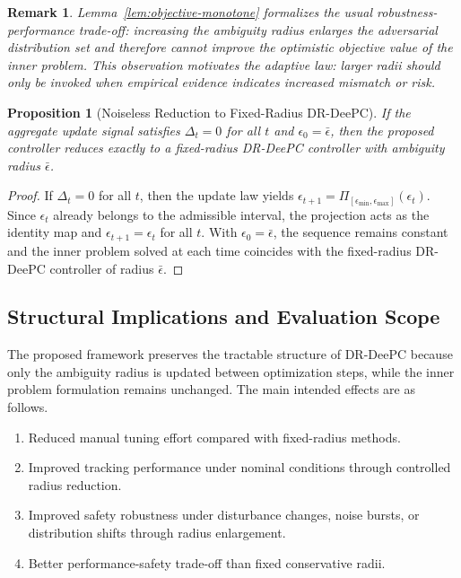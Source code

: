 \documentclass[conference]{IEEEtran}
\newtheorem{proposition}{Proposition}
\newtheorem{remark}{Remark}
\begin{document}
\begin{remark}
Lemma~\ref{lem:objective-monotone} formalizes the usual robustness-performance trade-off: increasing the ambiguity radius enlarges the adversarial distribution set and therefore cannot improve the optimistic objective value of the inner problem. This observation motivates the adaptive law: larger radii should only be invoked when empirical evidence indicates increased mismatch or risk.
\end{remark}

\begin{proposition}[Noiseless Reduction to Fixed-Radius DR-DeePC]
\label{prop:fixed-reduction}
If the aggregate update signal satisfies $\Delta_t = 0$ for all $t$ and $\epsilon_0 = \bar \epsilon$, then the proposed controller reduces exactly to a fixed-radius DR-DeePC controller with ambiguity radius $\bar \epsilon$.
\end{proposition}

\begin{proof}
If $\Delta_t = 0$ for all $t$, then the update law yields $\epsilon_{t+1}=\Pi_{[\epsilon_{\min},\epsilon_{\max}]}(\epsilon_t)$. Since $\epsilon_t$ already belongs to the admissible interval, the projection acts as the identity map and $\epsilon_{t+1}=\epsilon_t$ for all $t$. With $\epsilon_0=\bar \epsilon$, the sequence remains constant and the inner problem solved at each time coincides with the fixed-radius DR-DeePC controller of radius $\bar\epsilon$.
\end{proof}

\subsection{Structural Implications and Evaluation Scope}
The proposed framework preserves the tractable structure of DR-DeePC because only the ambiguity radius is updated between optimization steps, while the inner problem formulation remains unchanged. The main intended effects are as follows.
\begin{enumerate}
    \item Reduced manual tuning effort compared with fixed-radius methods.
    \item Improved tracking performance under nominal conditions through controlled radius reduction.
    \item Improved safety robustness under disturbance changes, noise bursts, or distribution shifts through radius enlargement.
    \item Better performance-safety trade-off than fixed conservative radii.
\end{enumerate}
\end{document}
